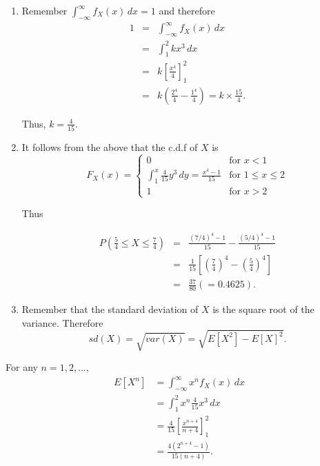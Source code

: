 \documentclass[
]{book}
\providecommand{\tightlist}{%
  \setlength{\itemsep}{0pt}\setlength{\parskip}{0pt}}
\begin{document}
\begin{enumerate}
\def\labelenumi{\arabic{enumi}.}
\tightlist
\item
  Remember \(\int_{-\infty}^\infty f_X (x) \, dx =1\) and therefore\\

  \begin{eqnarray*}
  1 &=& \int_{-\infty}^\infty f_X (x) \, dx \\
  &=& \int_1^2 k x^3 \, dx \\
  &=& k \left[ \frac{x^4}{4} \right]_1^2 \\
  &=& k \left(\frac{2^4}{4} -\frac{1^4}{4} \right)  = k \times \frac{15}{4}.
  \end{eqnarray*}

  Thus, \(k=\frac{4}{15}\).\\
\item
  It follows from the above that the c.d.f of \(X\) is\\

  \[ F_X (x) = \left\{ \begin{array}{ll} 0 & \mbox{for } x<1 \\ \int_1^x \frac{4}{15}y^3 \, dy = \frac{x^4-1}{15} & \mbox{for } 1 \leq x \leq 2 \\  1 & \mbox{for } x>2  \end{array} \right. \]

  Thus

  \begin{eqnarray*}
  P \left(\frac{5}{4}  \leq X \leq \frac{7}{4}\right) &=& \frac{(7/4)^4-1}{15} - \frac{(5/4)^4-1}{15} \\
  &=& \frac{1}{15} \left[\left( \frac{7}{4}\right)^4 -\left( \frac{5}{4}\right)^4 \right] \\
  &=& \frac{37}{80} (=0.4625).
  \end{eqnarray*}
\item
  Remember that the standard deviation of \(X\) is the square root of the variance. Therefore\\

  \[ sd (X) = \sqrt{var(X)} = \sqrt{E[X^2]- E[X]^2}. \]
\end{enumerate}

For any \(n=1,2,\ldots\),\\

\begin{align*} E[X^n] &= \int_{-\infty}^\infty x^n f_X(x) \, dx \\
&= \int_1^2 x^n \frac{4}{15} x^3 \, dx \\
&= \frac{4}{15} \left[\frac{x^{n+4}}{n+4} \right]_1^2 \\
&= \frac{4 (2^{n+4}-1)}{15(n+4)}. \end{align*}
\end{document}
